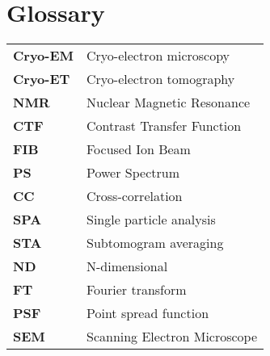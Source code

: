 \chapter{Glossary}


\begin{tabularx}{\linewidth}{@{}>{\bfseries}l X} %
Cryo-EM & Cryo-electron microscopy \\
Cryo-ET & Cryo-electron tomography \\
NMR & Nuclear Magnetic Resonance \\
CTF & Contrast Transfer Function \\
FIB & Focused Ion Beam \\
PS & Power Spectrum \\
CC & Cross-correlation \\
SPA & Single particle analysis \\
STA & Subtomogram averaging \\
ND & N-dimensional \\
FT & Fourier transform \\
PSF & Point spread function \\
SEM & Scanning Electron Microscope \\
\end{tabularx}


